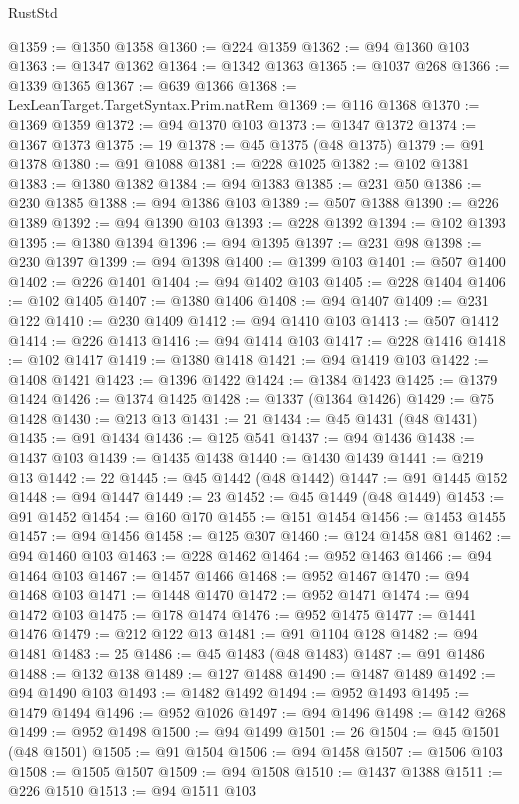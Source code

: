 \begin{lexlean}{RustStd}
\begin{coremodule}
{\begin{coremodule}
{{{{{{{{{{{{{{{{{{{{{{{{{{{{{{{{{{{{{@1359 := @1350 @1358
@1360 := @224 @1359
@1362 := @94 @1360 @103
@1363 := @1347 @1362
@1364 := @1342 @1363
@1365 := @1037 @268
@1366 := @1339 @1365
@1367 := @639 @1366
@1368 := LexLeanTarget.TargetSyntax.Prim.natRem
@1369 := @116 @1368
@1370 := @1369 @1359
@1372 := @94 @1370 @103
@1373 := @1347 @1372
@1374 := @1367 @1373
@1375 := 19
@1378 := @45 @1375 (@48 @1375)
@1379 := @91 @1378
@1380 := @91 @1088
@1381 := @228 @1025
@1382 := @102 @1381
@1383 := @1380 @1382
@1384 := @94 @1383
@1385 := @231 @50
@1386 := @230 @1385
@1388 := @94 @1386 @103
@1389 := @507 @1388
@1390 := @226 @1389
@1392 := @94 @1390 @103
@1393 := @228 @1392
@1394 := @102 @1393
@1395 := @1380 @1394
@1396 := @94 @1395
@1397 := @231 @98
@1398 := @230 @1397
@1399 := @94 @1398
@1400 := @1399 @103
@1401 := @507 @1400
@1402 := @226 @1401
@1404 := @94 @1402 @103
@1405 := @228 @1404
@1406 := @102 @1405
@1407 := @1380 @1406
@1408 := @94 @1407
@1409 := @231 @122
@1410 := @230 @1409
@1412 := @94 @1410 @103
@1413 := @507 @1412
@1414 := @226 @1413
@1416 := @94 @1414 @103
@1417 := @228 @1416
@1418 := @102 @1417
@1419 := @1380 @1418
@1421 := @94 @1419 @103
@1422 := @1408 @1421
@1423 := @1396 @1422
@1424 := @1384 @1423
@1425 := @1379 @1424
@1426 := @1374 @1425
@1428 := @1337 (@1364 @1426)
@1429 := @75 @1428
@1430 := @213 @13
@1431 := 21
@1434 := @45 @1431 (@48 @1431)
@1435 := @91 @1434
@1436 := @125 @541
@1437 := @94 @1436
@1438 := @1437 @103
@1439 := @1435 @1438
@1440 := @1430 @1439
@1441 := @219 @13
@1442 := 22
@1445 := @45 @1442 (@48 @1442)
@1447 := @91 @1445 @152
@1448 := @94 @1447
@1449 := 23
@1452 := @45 @1449 (@48 @1449)
@1453 := @91 @1452
@1454 := @160 @170
@1455 := @151 @1454
@1456 := @1453 @1455
@1457 := @94 @1456
@1458 := @125 @307
@1460 := @124 @1458 @81
@1462 := @94 @1460 @103
@1463 := @228 @1462
@1464 := @952 @1463
@1466 := @94 @1464 @103
@1467 := @1457 @1466
@1468 := @952 @1467
@1470 := @94 @1468 @103
@1471 := @1448 @1470
@1472 := @952 @1471
@1474 := @94 @1472 @103
@1475 := @178 @1474
@1476 := @952 @1475
@1477 := @1441 @1476
@1479 := @212 @122 @13
@1481 := @91 @1104 @128
@1482 := @94 @1481
@1483 := 25
@1486 := @45 @1483 (@48 @1483)
@1487 := @91 @1486
@1488 := @132 @138
@1489 := @127 @1488
@1490 := @1487 @1489
@1492 := @94 @1490 @103
@1493 := @1482 @1492
@1494 := @952 @1493
@1495 := @1479 @1494
@1496 := @952 @1026
@1497 := @94 @1496
@1498 := @142 @268
@1499 := @952 @1498
@1500 := @94 @1499
@1501 := 26
@1504 := @45 @1501 (@48 @1501)
@1505 := @91 @1504
@1506 := @94 @1458
@1507 := @1506 @103
@1508 := @1505 @1507
@1509 := @94 @1508
@1510 := @1437 @1388
@1511 := @226 @1510
@1513 := @94 @1511 @103
}}}}}}}}}}}}}}}}}}}}}}}}}}}}}}}}}}}}}
\end{coremodule}}
\end{coremodule}
\end{lexlean}

